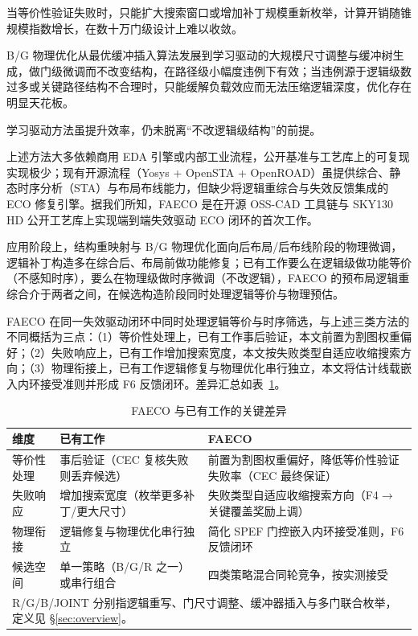 \documentclass[journal]{IEEEtran}
\begin{document}
当等价性验证失败时，只能扩大搜索窗口或增加补丁规模重新枚举\cite{zhuo2018patch}，计算开销随锥规模指数增长，在数十万门级设计上难以收敛。

B/G 物理优化从最优缓冲插入算法\cite{liang2012buffer}发展到学习驱动的大规模尺寸调整与缓冲树生成\cite{liu2021rlsizer,huang2025phys,chen2024aito,zhang2025buffalo}，做门级微调而不改变结构，在路径级小幅度违例下有效；当违例源于逻辑级数过多或关键路径结构不合理时，只能缓解负载效应而无法压缩逻辑深度，优化存在明显天花板\cite{liu2021rlsizer,huang2025phys}。

学习驱动方法\cite{chen2024aito,zhang2025buffalo}虽提升效率，仍未脱离“不改逻辑级结构”的前提。

上述方法大多依赖商用 EDA 引擎或内部工业流程，公开基准与工艺库上的可复现实现极少；现有开源流程（Yosys + OpenSTA + OpenROAD）虽提供综合、静态时序分析（STA）与布局布线能力，但缺少将逻辑重综合与失效反馈集成的 ECO 修复引擎。据我们所知，FAECO 是在开源 OSS-CAD 工具链与 SKY130 HD 公开工艺库上实现端到端失效驱动 ECO 闭环的首次工作。

应用阶段上，结构重映射与 B/G 物理优化面向后布局/后布线阶段的物理微调，逻辑补丁构造多在综合后、布局前做功能修复；已有工作要么在逻辑级做功能等价（不感知时序），要么在物理级做时序微调（不改逻辑），FAECO 的预布局逻辑重综合介于两者之间，在候选构造阶段同时处理逻辑等价与物理预估。

FAECO 在同一失效驱动闭环中同时处理逻辑等价与时序筛选，与上述三类方法的不同概括为三点：（1）等价性处理上，已有工作事后验证，本文前置为割图权重偏好；（2）失败响应上，已有工作增加搜索宽度，本文按失败类型自适应收缩搜索方向；（3）物理衔接上，已有工作逻辑修复与物理优化串行独立，本文将估计线载嵌入内环接受准则并形成 F6 反馈闭环。差异汇总如表~\ref{tab:related_diff}。

\begin{table}[!t]
\centering
\caption{FAECO 与已有工作的关键差异}
\label{tab:related_diff}
\footnotesize
\setlength{\tabcolsep}{3pt}
\begin{tabular}{p{2.2cm}p{2.8cm}p{3.2cm}}
\toprule
\textbf{维度} & \textbf{已有工作} & \textbf{FAECO} \\
\midrule
等价性处理 & 事后验证（CEC 复核失败则丢弃候选） & 前置为割图权重偏好，降低等价性验证失败率（CEC 最终保证） \\
失败响应 & 增加搜索宽度（枚举更多补丁/更大尺寸） & 失败类型自适应收缩搜索方向（F4$\to$关键覆盖奖励上调） \\
物理衔接 & 逻辑修复与物理优化串行独立 & 简化 SPEF 门控嵌入内环接受准则，F6 反馈闭环 \\
候选空间 & 单一策略（B/G/R 之一）或串行组合 & 四类策略混合同轮竞争，按实测接受 \\
\bottomrule
\multicolumn{3}{p{8.0cm}}{\footnotesize R/G/B/JOINT 分别指逻辑重写、门尺寸调整、缓冲器插入与多门联合枚举，定义见 \S\ref{sec:overview}。}\\
\end{tabular}
\end{table}
\end{document}
